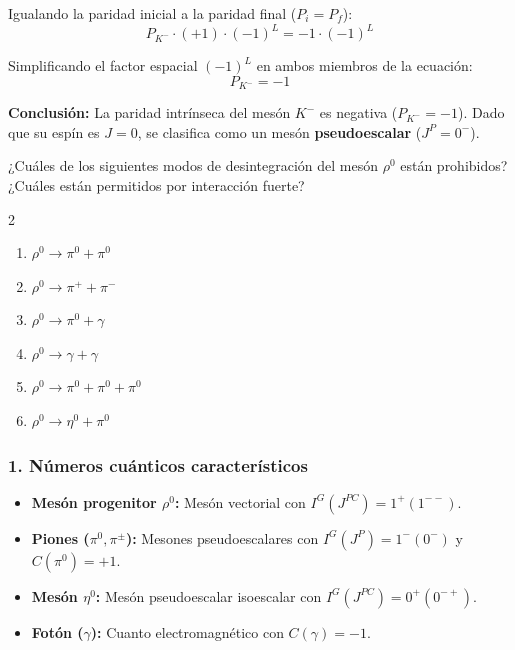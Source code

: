 \begin{problema}
Igualando la paridad inicial a la paridad final ($P_i = P_f$):
\begin{equation*}
P_{K^-} \cdot (+1) \cdot (-1)^L = -1 \cdot (-1)^L
\end{equation*}

Simplificando el factor espacial $(-1)^L$ en ambos miembros de la ecuación:
\begin{equation*}
P_{K^-} = -1
\end{equation*}

\textbf{Conclusión:} La paridad intrínseca del mesón $K^-$ es negativa ($P_{K^-} = -1$). Dado que su espín es $J = 0$, se clasifica como un mesón \textbf{pseudoescalar} ($J^P = 0^-$).
\end{problema}
\newpage
\begin{problema}
¿Cuáles de los siguientes modos de desintegración del mesón $\rho^0$ están prohibidos? ¿Cuáles están permitidos por interacción fuerte?

\begin{multicols}{2}
\begin{enumerate}[label=\alph*)]
    \item $\rho^0 \rightarrow \pi^0 + \pi^0$
    \item $\rho^0 \rightarrow \pi^+ + \pi^-$
    \item $\rho^0 \rightarrow \pi^0 + \gamma$
    \item $\rho^0 \rightarrow \gamma + \gamma$
    \item $\rho^0 \rightarrow \pi^0 + \pi^0 + \pi^0$
    \item $\rho^0 \rightarrow \eta^0 + \pi^0$
\end{enumerate}
\end{multicols}

\tcblower

\subsubsection*{1. Números cuánticos característicos}

\begin{itemize}
    \item \textbf{Mesón progenitor $\rho^0$:} Mesón vectorial con $I^G(J^{PC}) = 1^+(1^{--})$.
    \item \textbf{Piones ($\pi^0, \pi^\pm$):} Mesones pseudoescalares con $I^G(J^{P}) = 1^-(0^-)$ y $C(\pi^0) = +1$.
    \item \textbf{Mesón $\eta^0$:} Mesón pseudoescalar isoescalar con $I^G(J^{PC}) = 0^+(0^{-+})$.
    \item \textbf{Fotón ($\gamma$):} Cuanto electromagnético con $C(\gamma) = -1$.
\end{itemize}


\end{problema}
